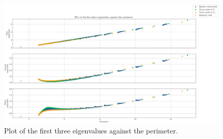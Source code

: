\begin{figure}[!htb]
    \centering
    \begin{minipage}[c]{0.8\textwidth}
        \centering
        \includegraphics[width=\textwidth]{Images/Dirac/triangles/triangle_first_eigenvalues.png}
        \caption{Plot of the first three eigenvalues against the perimeter.}
        \label{dirac_smooth_first_eigenvalues}
    \end{minipage}

    \vspace{0.5cm}


\end{figure}
